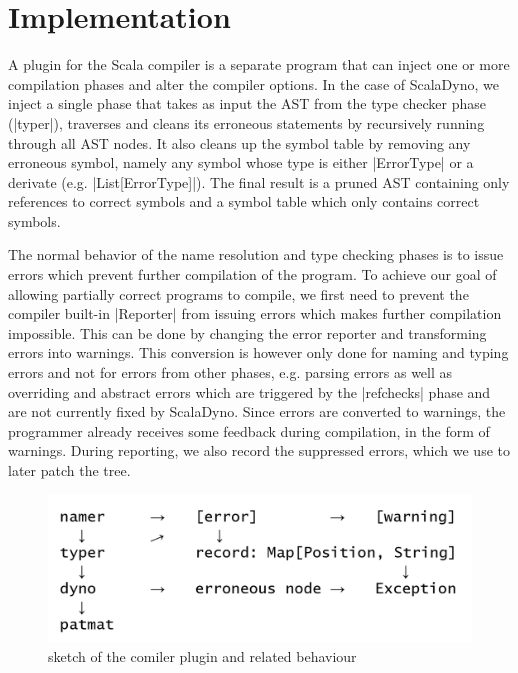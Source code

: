 \section{Implementation}

A plugin for the Scala compiler is a separate program that can inject one or more compilation phases and alter the compiler options. In the case of ScalaDyno, we inject a single phase that takes as input the AST from the type checker phase (|typer|), traverses and cleans its erroneous statements by recursively running through all AST nodes. It also cleans up the symbol table by removing any erroneous symbol, namely any symbol whose type is either |ErrorType| or a derivate (e.g. |List[ErrorType]|). The final result is a pruned AST containing only references to correct symbols and a symbol table which only contains correct symbols.

The normal behavior of the name resolution and type checking phases is to issue errors which prevent further compilation of the program. To achieve our goal of allowing partially correct programs to compile, we first need to prevent the compiler built-in |Reporter| from issuing errors which makes further compilation impossible. This can be done by changing the error reporter and transforming errors into warnings. This conversion is however only done for naming and typing errors and not for errors from other phases, e.g. parsing errors as well as overriding and abstract errors which are triggered by the |refchecks| phase and are not currently fixed by ScalaDyno. Since errors are converted to warnings, the programmer already receives some feedback during compilation, in the form of warnings. During reporting, we also record the suppressed errors, which we use to later patch the tree.

\begin{figure}[h]
\includegraphics[width=0.9\columnwidth]{compiler_structure.png}
\caption[structure sketch]
   {sketch of the comiler plugin and related behaviour}
\end{figure}

